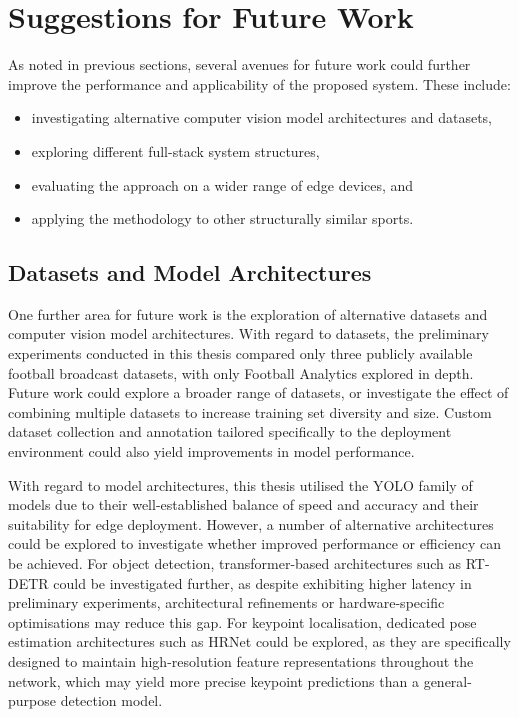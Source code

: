 \section{Suggestions for Future Work}

As noted in previous sections, several avenues for future work could further improve the performance and applicability of the proposed system. These include:

\begin{itemize}
\item investigating alternative computer vision model architectures and datasets,
\item exploring different full-stack system structures,
\item evaluating the approach on a wider range of edge devices, and
\item applying the methodology to other structurally similar sports.
\end{itemize}

\subsection{Datasets and Model Architectures}
One further area for future work is the exploration of alternative datasets and computer vision model architectures. With regard to datasets, the preliminary experiments conducted in this thesis compared only three publicly available football broadcast datasets, with only Football Analytics \cite{roboflow_football_analytics_gnykk_model1} explored in depth. Future work could explore a broader range of datasets, or investigate the effect of combining multiple datasets to increase training set diversity and size. Custom dataset collection and annotation tailored specifically to the deployment environment could also yield improvements in model performance.

With regard to model architectures, this thesis utilised the YOLO family of models due to their well-established balance of speed and accuracy and their suitability for edge deployment. However, a number of alternative architectures could be explored to investigate whether improved performance or efficiency can be achieved. For object detection, transformer-based architectures such as RT-DETR \cite{Zhao2023RTDETR} could be investigated further, as despite exhibiting higher latency in preliminary experiments, architectural refinements or hardware-specific optimisations may reduce this gap. For keypoint localisation, dedicated pose estimation architectures such as HRNet \cite{sun2019deephighresolutionrepresentationlearning} could be explored, as they are specifically designed to maintain high-resolution feature representations throughout the network, which may yield more precise keypoint predictions than a general-purpose detection model.


